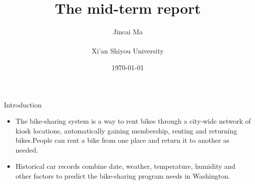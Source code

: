 \documentclass[
 size=14pt,
 paper=smartboard,  %
 mode=present, 		%
 display=slides, 	%
 style=tuliplab,  	%
 pauseslide,
 fleqn,leqno]{powerdot}
\title{The mid-term report}
\author{
   Jincai Ma
\\
\\Xi'an Shiyou University}
\date{\today}
\begin{document}
\maketitle







\begin{slide}{Introduction}
\begin{center}

{
\begin{itemize}
\item 
The bike-sharing system is a way to rent bikes through a city-wide network of kiosk locations, automatically gaining membership, renting and returning bikes.People can rent a bike from one place and return it to another as needed.
\item Historical car records combine date, weather, temperature, humidity and other factors to predict the bike-sharing program needs in Washington.

\end{itemize}
}

\end{center}
\bigskip
\begin{center}

\end{center}
\bigskip



\end{slide}
\end{document}
